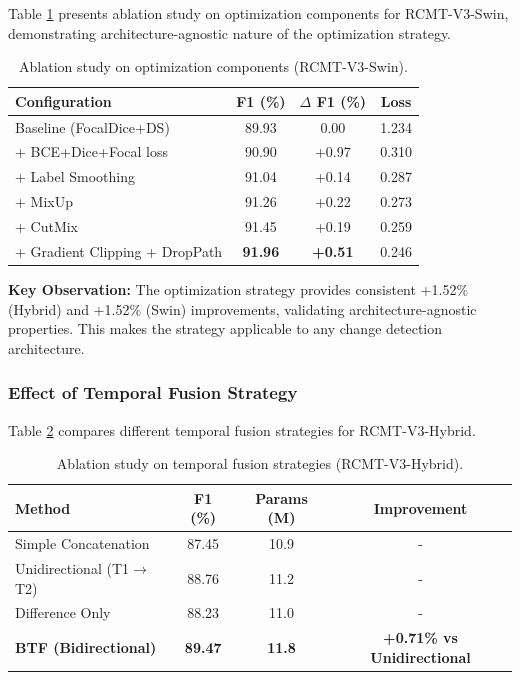 \documentclass[journal]{IEEEtran}
\begin{document}
{Table \ref{tab:opt_swin} presents ablation study on optimization components for RCMT-V3-Swin, demonstrating architecture-agnostic nature of the optimization strategy.

\begin{table}[ht]
\centering
\caption{Ablation study on optimization components (RCMT-V3-Swin).}
\label{tab:opt_swin}
\begin{tabular}{lccc}
\toprule
\textbf{Configuration} & \textbf{F1 (\%)} & \textbf{$\Delta$ F1 (\%)} & \textbf{Loss} \\
\midrule
    Baseline (FocalDice+DS) & 89.93 & 0.00 & 1.234 \\
    + BCE+Dice+Focal loss & 90.90 & +0.97 & 0.310 \\
    + Label Smoothing & 91.04 & +0.14 & 0.287 \\
    + MixUp & 91.26 & +0.22 & 0.273 \\
    + CutMix & 91.45 & +0.19 & 0.259 \\
    + Gradient Clipping + DropPath & \textbf{91.96} & \textbf{+0.51} & 0.246 \\
\bottomrule
\end{tabular}
\end{table}

\textbf{Key Observation:} The optimization strategy provides consistent +1.52\% (Hybrid) and +1.52\% (Swin) improvements, validating architecture-agnostic properties. This makes the strategy applicable to any change detection architecture.

\subsubsection{Effect of Temporal Fusion Strategy}

Table \ref{tab:fusion_hybrid} compares different temporal fusion strategies for RCMT-V3-Hybrid.

\begin{table}[ht]
\centering
\caption{Ablation study on temporal fusion strategies (RCMT-V3-Hybrid).}
\label{tab:fusion_hybrid}
\begin{tabular}{lccc}
\toprule
\textbf{Method} & \textbf{F1 (\%)} & \textbf{Params (M)} & \textbf{Improvement} \\
\midrule
    Simple Concatenation & 87.45 & 10.9 & - \\
    Unidirectional (T1$\rightarrow$T2) & 88.76 & 11.2 & - \\
    Difference Only & 88.23 & 11.0 & - \\
    \textbf{BTF (Bidirectional)} & \textbf{89.47} & \textbf{11.8} & \textbf{+0.71\% vs Unidirectional} \\
\bottomrule
\end{tabular}
\end{table}

}
\end{document}
